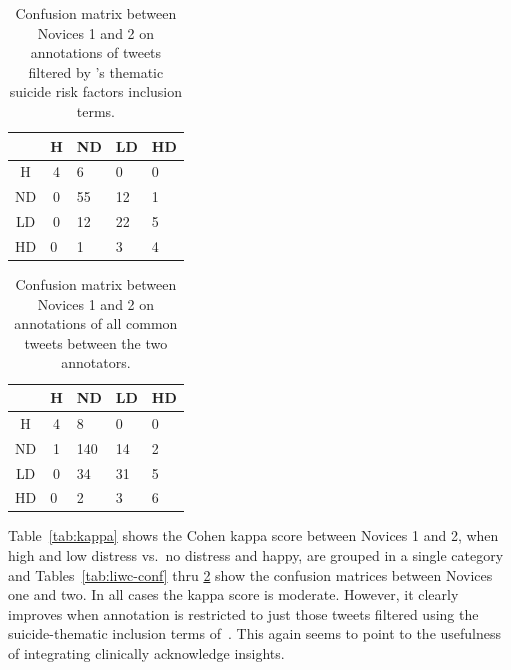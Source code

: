 \documentclass[11pt]{article}
\begin{document}
\begin{table}[h]
\centering
\begin{tabular}{c|c|l||l|l|}
\cline{2-5}
                         & H                       & ND & LD & HD \\ \hline
\multicolumn{1}{|c|}{H}  & 4                       & 6  & 0  & 0  \\ \hline
\multicolumn{1}{|c|}{ND} & 0                       & 55 & 12 & 1  \\ \hline \hline
\multicolumn{1}{|c|}{LD} & 0                       & 12 & 22 & 5  \\ \hline
\multicolumn{1}{|l}{HD}  & \multicolumn{1}{|l|}{0} & 1  & 3  & 4  \\ \hline
\end{tabular}
\caption {Confusion matrix between Novices 1 and 2 on annotations of tweets filtered by 's thematic suicide risk factors inclusion terms.}
\label{tab:j-conf}
\end{table}

\begin{table}[h]
\centering
\begin{tabular}{c|c|l||l|l|}
\cline{2-5}
                         & H                       & ND  & LD & HD \\ \hline
\multicolumn{1}{|c|}{H}  & 4                       & 8   & 0  & 0  \\ \hline
\multicolumn{1}{|c|}{ND} & 1                      & 140 & 14 & 2  \\ \hline \hline
\multicolumn{1}{|c|}{LD} & 0                       & 34  & 31 & 5  \\ \hline
\multicolumn{1}{|l}{HD}  & \multicolumn{1}{|l|}{0} & 2   & 3  & 6  \\ \hline
\end{tabular}
\caption {Confusion matrix between Novices 1 and 2 on annotations of all common tweets between the two annotators.}
\label{tab:both-conf}
\end{table}



Table~\ref{tab:kappa} shows the Cohen kappa score between Novices 1 and 2, when high and low distress vs.\ no distress and happy, are grouped in a single category and Tables~\ref{tab:liwc-conf} thru \ref{tab:both-conf} show the confusion matrices between Novices one and two. In all cases the kappa score is moderate. However, it clearly improves when annotation is restricted to just those tweets filtered using the suicide-thematic inclusion terms of~. This again seems to point to the usefulness of integrating clinically acknowledge insights.
\end{document}
